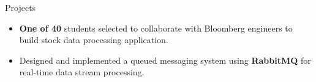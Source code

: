 \documentclass{resume} %
\begin{document}
\begin{workSection}{Projects}

	\customItem[
		title=Bloomberg Tech Lab on Campus,
		duration=Team of 2 | April 2024,
	]
	\begin{itemize}
		\vspace{-0.5em}
		\itemsep -6pt {}
		\item \textbf{One of 40} students selected to collaborate with Bloomberg engineers 
		to build stock data processing application. %
		\item Designed and implemented a queued messaging system using \textbf{RabbitMQ} for real-time data stream processing.
	\end{itemize}
	
	

\end{workSection}
\end{document}
